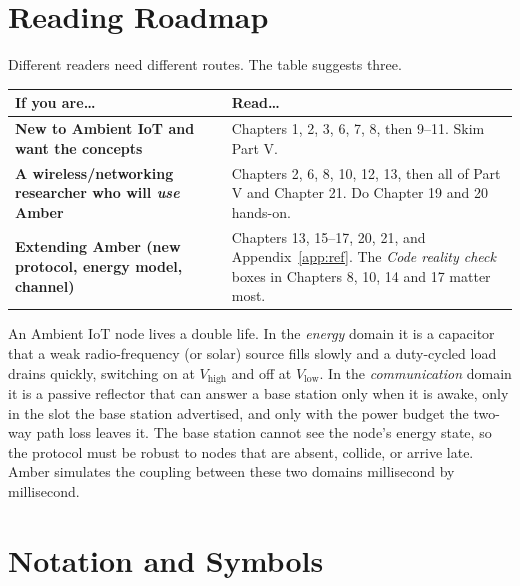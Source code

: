 \chapter*{Reading Roadmap}

Different readers need different routes. The table suggests three.

\begin{center}
\small
\begin{tabularx}{\linewidth}{@{}>{\sffamily\bfseries}p{2.9cm}X@{}}
\toprule
If you are\dots & Read\dots \\
\midrule
New to Ambient IoT and want the concepts &
 Chapters 1, 2, 3, 6, 7, 8, then 9--11. Skim Part V.\\[3pt]
A wireless/networking researcher who will \emph{use} Amber &
 Chapters 2, 6, 8, 10, 12, 13, then all of Part V and Chapter 21.
 Do Chapter 19 and 20 hands-on.\\[3pt]
Extending Amber (new protocol, energy model, channel) &
 Chapters 13, 15--17, 20, 21, and Appendix~\ref{app:ref}. The
 \emph{Code reality check} boxes in Chapters 8, 10, 14 and 17 matter most.\\
\bottomrule
\end{tabularx}
\end{center}

\begin{keyidea}
An Ambient IoT node lives a double life. In the \emph{energy} domain it is a
capacitor that a weak radio-frequency (or solar) source fills slowly and a
duty-cycled load drains quickly, switching on at $V_{\mathrm{high}}$ and off at
$V_{\mathrm{low}}$. In the \emph{communication} domain it is a passive reflector that can answer a
base station only when it is awake, only in the slot the base station
advertised, and only with the power budget the two-way path loss leaves it.
The base station cannot see the node's energy state, so the protocol must be
robust to nodes that are absent, collide, or arrive late. Amber simulates the
coupling between these two domains millisecond by millisecond.
\end{keyidea}

\chapter*{Notation and Symbols}

